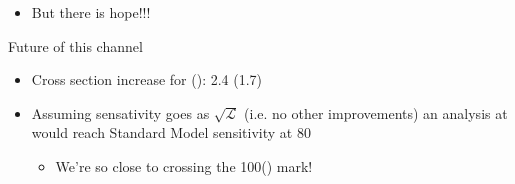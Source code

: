 \begin{frame}
\begin{block}{}
\begin{itemize}
\begin{itemize}
				\item But there is hope!!!
			\end{itemize}
		\end{itemize}
	\end{block}
	\vspace*{-0.1cm}
	\begin{alertblock}{Future of this channel}
		\begin{itemize}
			\item Cross section increase for \ggH (\Wjets): 2.4 (1.7)
			\item Assuming sensativity goes as $\sqrt{\mathcal{L}}$ (i.e. no other improvements) an analysis at \CM{13\tev} would reach Standard Model sensitivity at 80\fbinv
			\begin{itemize}
				\item We're so close to crossing the 100\fbinv (\CM{13\tev}) mark!
			\end{itemize}
		\end{itemize}
	\end{alertblock}

\end{frame}